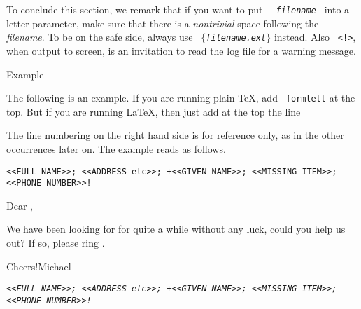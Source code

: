 {\medskip

To conclude this section, we remark that if you want to put {\tt
\string\ {\sl filename} } into a letter parameter, make
sure that there is a {\sl nontrivial} space following the {\sl
filename}. To be on the safe side, always use {\tt
\string{} $\{$\sl filename.ext$\}$} instead. Also {\tt
<!>}, when output to screen, is an invitation to read the log
file for a warning message.

\bigskip
{\lbold Example}


\smallskip

The following is an example. If you are running plain \TeX, add
{\tt\string\ formlett} at the top. But if you are running
\LaTeX, then just add at the top the line

\relax
\stt\beginrawlist[][][4][][][3.3in]{}
  
\endrawlist
\rm



The line numbering on the right hand side is for reference only,
as in the other occurrences later on. The example reads as
follows.

\medskip

\stt\beginrawlist[][][4][][][3.3in]{}
  \beginletter
  \paranames             %
    \tt<<FULL NAME>>;%
    \tt<<ADDRESS-etc>>;%
   +\tt<<GIVEN NAME>>;%
    \tt<<MISSING ITEM>>;%
    \tt<<PHONE NUMBER>>!
  \loaddefaultparas      %

  \NOPAGENUMBERS\parindent=0pt
  \noindent{\it\paras[1]}\par
  \blockparas[2]\par\bigskip

  Dear \paras[1][2],\par\medskip
  We have been looking for
  \paras[2][2] for quite a while
  without any luck, could you help
  us out? If so, please ring
  \paras[3][2]. \par\medskip
  Cheers!\hfill Michael\vfill\eject
  \endletter
  \preview \showparas
\endrawlist
\rm


\medskip


  \beginletter
\sl
\hsize=3.1in\relax
\medskip
  \paranames             %
    \tt<<FULL NAME>>;%
    \tt<<ADDRESS-etc>>;%
   +\tt<<GIVEN NAME>>;%
    \tt<<MISSING ITEM>>;%
    \tt<<PHONE NUMBER>>!
  \loaddefaultparas      %

  \NOPAGENUMBERS\parindent=0pt\overfullrule=0pt
  \noindent{\it\paras[1]}\par
  \blockparas[2]\par\medskip

}
